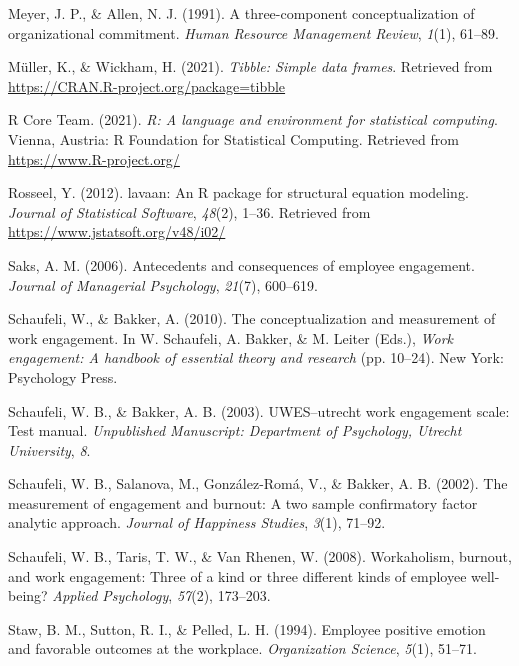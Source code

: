 \documentclass[
  english,
  man]{apa6}
\begin{document}
\leavevmode\hypertarget{ref-meyer_three-component_1991}{}%
Meyer, J. P., \& Allen, N. J. (1991). A three-component conceptualization of organizational commitment. \emph{Human Resource Management Review}, \emph{1}(1), 61--89.

\leavevmode\hypertarget{ref-R-tibble}{}%
Müller, K., \& Wickham, H. (2021). \emph{Tibble: Simple data frames}. Retrieved from \url{https://CRAN.R-project.org/package=tibble}

\leavevmode\hypertarget{ref-R-base}{}%
R Core Team. (2021). \emph{R: A language and environment for statistical computing}. Vienna, Austria: R Foundation for Statistical Computing. Retrieved from \url{https://www.R-project.org/}

\leavevmode\hypertarget{ref-R-lavaan}{}%
Rosseel, Y. (2012). lavaan: An R package for structural equation modeling. \emph{Journal of Statistical Software}, \emph{48}(2), 1--36. Retrieved from \url{https://www.jstatsoft.org/v48/i02/}

\leavevmode\hypertarget{ref-saks2006antecedents}{}%
Saks, A. M. (2006). Antecedents and consequences of employee engagement. \emph{Journal of Managerial Psychology}, \emph{21}(7), 600--619.

\leavevmode\hypertarget{ref-schaufeli_conceptualization_2010}{}%
Schaufeli, W., \& Bakker, A. (2010). The conceptualization and measurement of work engagement. In W. Schaufeli, A. Bakker, \& M. Leiter (Eds.), \emph{Work engagement: A handbook of essential theory and research} (pp. 10--24). New York: Psychology Press.

\leavevmode\hypertarget{ref-schaufeli_uwesutrecht_2003}{}%
Schaufeli, W. B., \& Bakker, A. B. (2003). UWES--utrecht work engagement scale: Test manual. \emph{Unpublished Manuscript: Department of Psychology, Utrecht University}, \emph{8}.

\leavevmode\hypertarget{ref-schaufeli_measurement_2002}{}%
Schaufeli, W. B., Salanova, M., González-Romá, V., \& Bakker, A. B. (2002). The measurement of engagement and burnout: A two sample confirmatory factor analytic approach. \emph{Journal of Happiness Studies}, \emph{3}(1), 71--92.

\leavevmode\hypertarget{ref-schaufeli2008workaholism}{}%
Schaufeli, W. B., Taris, T. W., \& Van Rhenen, W. (2008). Workaholism, burnout, and work engagement: Three of a kind or three different kinds of employee well-being? \emph{Applied Psychology}, \emph{57}(2), 173--203.

\leavevmode\hypertarget{ref-staw_employee_1994}{}%
Staw, B. M., Sutton, R. I., \& Pelled, L. H. (1994). Employee positive emotion and favorable outcomes at the workplace. \emph{Organization Science}, \emph{5}(1), 51--71.
\end{document}
